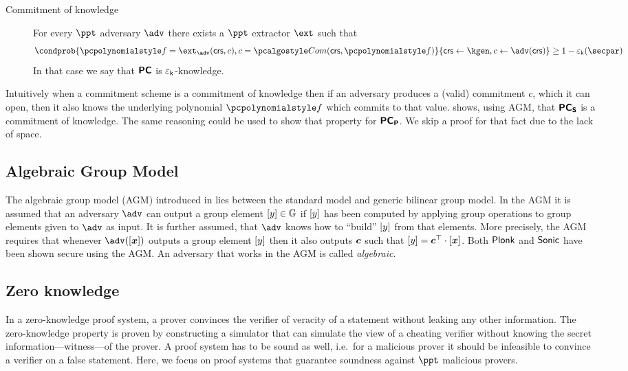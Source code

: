 \let\accentvec\vec \documentclass[runningheads]{llncs}
\def\vec#1{\mathchoice{\mbox{\boldmath$\displaystyle#1$}}
{\mbox{\boldmath$\textstyle#1$}} {\mbox{\boldmath$\scriptstyle#1$}}
{\mbox{\boldmath$\scriptscriptstyle#1$}}}
\begin{document}
\begin{description}
\item[Commitment of knowledge] For every $\ppt$ adversary $\adv$ there exists a
  $\ppt$ extractor $\ext$ such that
\[
	\condprob{\p{f} = \ext_\adv(\crs, c), c = \com(\crs, \p{f})}{\crs \gets
	\kgen, c \gets \adv(\crs)} \geq 1 -
	\epsk(\secpar)
\]
In that case we say that $\bm{\mathsf{PC}}$ is $\varepsilon_{\mathsf{k}}$-knowledge.
\end{description}
Intuitively when a commitment scheme is a commitment of knowledge then if an
adversary produces a (valid) commitment $c$, which it can open, then it also
knows the underlying polynomial $\p{f}$ which commits to that value.
\cite{CCS:MBKM19} shows, using AGM, that $\bm{\mathsf{PC}}_{\bm{\mathsf{S}}}$ is a commitment of knowledge.
The same reasoning could be used to show that property for $\bm{\mathsf{PC}}_{\bm{\mathsf{P}}}$. We skip a
proof for that fact due to the lack of space.

\subsection{Algebraic Group Model}
The algebraic group model (AGM) introduced in \cite{C:FucKilLos18} lies between
the standard model and generic bilinear group model. In the AGM it is assumed
that an adversary $\adv$ can output a group element $\left[y\right] \in \mathbb{G}$ if
$\left[y\right]$ has been computed by applying group operations to group elements
given to $\adv$ as input. It is further assumed, that $\adv$ knows how to
``build'' $\left[y\right]$ from that elements. More precisely, the AGM requires that
whenever $\adv(\gnone{\vec{x}})$ outputs a group element $\left[y\right]$ then it
also outputs $\vec{c}$ such that $\gnone{y} = \vec{c}^\top \cdot
\gnone{\vec{x}}$. Both $\textnormal{\textsf{Plonk}}$ and ${\textnormal{\textsf{Sonic}}}$ have been shown secure using the
AGM. An adversary that works in the AGM is called \emph{algebraic}.

\subsection{Zero knowledge}
In a zero-knowledge proof system, a prover convinces the verifier of veracity of
a statement without leaking any other information. The zero-knowledge property
is proven by constructing a simulator that can simulate the view of a cheating
verifier without knowing the secret information---witness---of the prover. A
proof system has to be sound as well, i.e.~for a malicious prover it should be
infeasible to convince a verifier on a false statement. Here, we focus on proof
systems that guarantee soundness against $\ppt$ malicious provers.
\end{document}
